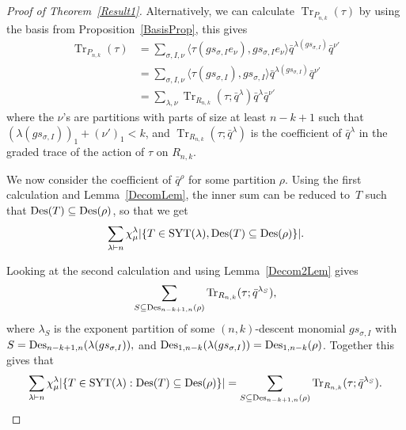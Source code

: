 \documentclass[10pt]{article}
\newcommand{\Tr}{\operatorname{Tr}}\newcommand{\rev}{\operatorname{rev}}
\begin{document}
\begin{proof}[Proof of Theorem~\ref{Result1}]
		Alternatively, we can calculate $\Tr _{P_{n,k}}(\tau)$ by using the basis from Proposition~\ref{BasisProp}, this gives
\begin{align}\Tr _{P_{n,k}}(\tau)&=\sum_{\sigma,I,\nu} \langle \tau(gs_{\sigma,I} e_\nu),gs_{\sigma,I} e_\nu\rangle 
\bar{q}^{\lambda(gs_{\sigma,I})}\bar{q}^{\nu'}\\
&=\sum_{\sigma,I,\nu} \langle \tau(gs_{\sigma,I}),gs_{\sigma,I} \rangle \bar{q}^{\lambda(gs_{\sigma,I})}\bar{q}^{\nu'}\\
&=\sum_{\lambda,\nu} \Tr _{R_{n,k}}(\tau; \bar{q}^\lambda)\bar{q}^{\lambda}\bar{q}^{\nu'}\end{align}
where the $\nu$'s are partitions with parts of size at least $n-k+1$ such that $(\lambda(gs_{\sigma,I}))_1+(\nu')_1<k$, and 
$\Tr _{R_{n,k}}(\tau;\bar{q}^\lambda)$ is the coefficient of $\bar{q}^\lambda$ in the graded trace of the action of $\tau$ on 
$R_{n,k}$.

		We now consider the coefficient of $\bar{q}^\rho$ for some partition $\rho$. Using the first calculation and Lemma~\ref{DecomLem}, the inner sum can be reduced to~$T$ such that $\operatorname{Des} (T)\subseteq \operatorname{Des} (\rho)$, so that we 
get
\begin{equation}
\sum_{\lambda\vdash n} \chi^\lambda_\mu\vert \{T\in \operatorname{SYT} (\lambda), \operatorname{Des} (T)\subseteq 
\operatorname{Des} (\rho)\}\vert.
\end{equation}

Looking at the second calculation and using Lemma~\ref{Decom2Lem} gives
\begin{equation}
\sum_{S\subseteq \Des _{n-k+1,n}(\rho)} 
\Tr _{R_{n,k}}(\tau;\bar{q}^{\lambda_S}),
\end{equation}
where $\lambda_S$ is the exponent partition of some $(n,k)$-descent 
monomial $gs_{\sigma, I}$ with $S=\operatorname{Des} _{n-k+1,n}(\lambda(gs_{\sigma, I})),$ and 
$\operatorname{Des} _{1,n-k}(\lambda(gs_{\sigma,I}))=\operatorname{Des} _{1,n-k}(\rho)$. Together this gives that
\begin{equation}
\sum_{\lambda\vdash n} 
\chi^\lambda_\mu\vert \{T\in \SYT (\lambda): \Des (T)\subseteq \Des (\rho)\}\vert=\sum_{S\subseteq \Des _{n-k+1,n}(\rho)} 
\Tr _{R_{n,k}}(\tau;\bar{q}^{\lambda_S}).
\end{equation}



\end{proof}
\end{document}
